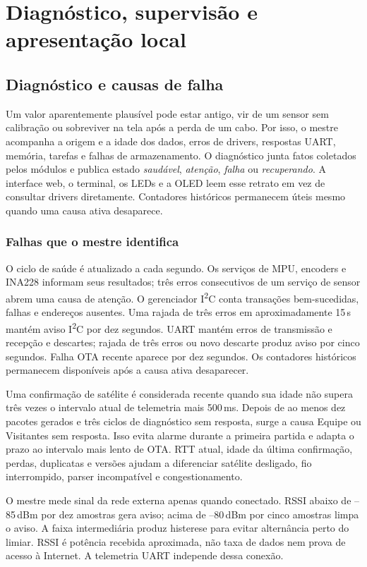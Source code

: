 \chapter{Diagnóstico, supervisão e apresentação local}\label{cap:diagnostico}
\section{Diagnóstico e causas de falha}
Um valor aparentemente plausível pode estar antigo, vir de um sensor sem calibração ou sobreviver na tela após a perda de um cabo. Por isso, o mestre acompanha a origem e a idade dos dados, erros de drivers, respostas UART, memória, tarefas e falhas de armazenamento. O diagnóstico junta fatos coletados pelos módulos e publica estado \emph{saudável}, \emph{atenção}, \emph{falha} ou \emph{recuperando}. A interface web, o terminal, os LEDs e a OLED leem esse retrato em vez de consultar drivers diretamente. Contadores históricos permanecem úteis mesmo quando uma causa ativa desaparece.

\subsection{Falhas que o mestre identifica}
O ciclo de saúde é atualizado a cada segundo. Os serviços de MPU, encoders e INA228 informam seus resultados; três erros consecutivos de um serviço de sensor abrem uma causa de atenção. O gerenciador I\textsuperscript{2}C conta transações bem-sucedidas, falhas e endereços ausentes. Uma rajada de três erros em aproximadamente 15\,s mantém aviso I\textsuperscript{2}C por dez segundos. UART mantém erros de transmissão e recepção e descartes; rajada de três erros ou novo descarte produz aviso por cinco segundos. Falha OTA recente aparece por dez segundos. Os contadores históricos permanecem disponíveis após a causa ativa desaparecer.

Uma confirmação de satélite é considerada recente quando sua idade não supera três vezes o intervalo atual de telemetria mais 500\,ms. Depois de ao menos dez pacotes gerados e três ciclos de diagnóstico sem resposta, surge a causa Equipe ou Visitantes sem resposta. Isso evita alarme durante a primeira partida e adapta o prazo ao intervalo mais lento de OTA. RTT atual, idade da última confirmação, perdas, duplicatas e versões ajudam a diferenciar satélite desligado, fio interrompido, parser incompatível e congestionamento.

O mestre mede sinal da rede externa apenas quando conectado. RSSI abaixo de --85\,dBm por dez amostras gera aviso; acima de --80\,dBm por cinco amostras limpa o aviso. A faixa intermediária produz histerese para evitar alternância perto do limiar. RSSI é potência recebida aproximada, não taxa de dados nem prova de acesso à Internet. A telemetria UART independe dessa conexão.

